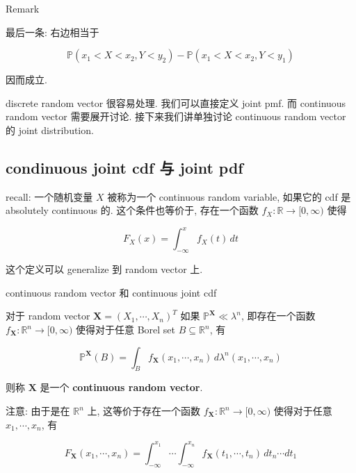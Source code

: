 \documentclass{qlnotes-export}
\begin{document}
\begin{qlremark}{Remark}

最后一条: 右边相当于

\[{\mathbb{P}}(x_{1} < X < x_{2},Y < y_{2}) - {\mathbb{P}}(x_{1} < X < x_{2},Y < y_{1})\]

因而成立.

\end{qlremark}

discrete random vector 很容易处理. 我们可以直接定义 joint pmf. 而 continuous random vector 需要展开讨论. 接下来我们讲单独讨论 continuous random vector 的 joint distribution.

\subsection{condinuous joint cdf 与 joint pdf}\label{condinuous-joint-cdf-ux4e0e-joint-pdf}

recall: 一个随机变量 \(X\) 被称为一个 continuous random variable, 如果它的 cdf 是 absolutely continuous 的. 这个条件也等价于, 存在一个函数 \(f_{X}:{\mathbb{R}}\rightarrow\lbrack 0,\infty)\) 使得

\[F_{X}(x) = \int_{- \infty}^{x}f_{X}(t)\, dt\]

这个定义可以 generalize 到 random vector 上.

\begin{definition}{continuous random vector 和 continuous joint cdf}\label{def-03-joint-conditional-distribution-continuous-random-vector-continuous-joint-cdf}

对于 random vector \(\mathbf{X} = (X_{1},\cdots,X_{n})^{T}\) 如果 \({\mathbb{P}}^{\mathbf{X}} \ll \lambda^{n}\), 即存在一个函数 \(f_{\mathbf{X}}:{\mathbb{R}}^{n}\rightarrow\lbrack 0,\infty)\) 使得对于任意 Borel set \(B \subseteq {\mathbb{R}}^{n}\), 有

\[{\mathbb{P}}^{\mathbf{X}}(B) = \int_{B}f_{\mathbf{X}}(x_{1},\cdots,x_{n})\, d\lambda^{n}(x_{1},\cdots,x_{n})\]

则称 \(\mathbf{X}\) 是一个 \textbf{continuous random vector}.

注意: 由于是在 \({\mathbb{R}}^{n}\) 上, 这等价于存在一个函数 \(f_{\mathbf{X}}:{\mathbb{R}}^{n}\rightarrow\lbrack 0,\infty)\) 使得对于任意 \(x_{1},\cdots,x_{n}\), 有

\[F_{\mathbf{X}}(x_{1},\cdots,x_{n}) = \int_{- \infty}^{x_{1}}\cdots\int_{- \infty}^{x_{n}}f_{\mathbf{X}}(t_{1},\cdots,t_{n})\, dt_{n}\cdots dt_{1}\]

\end{definition}
\end{document}
